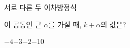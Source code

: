 서로 다른 두 이차방정식 \par\smallskip{}\par\smallskip\noindent 이 공통인 근 $\alpha$를 가질 때, $k+\alpha$의 값은? 
\begin{choices32}{$-4$}{$-3$}{$-2$}{$-1$}{$0$}\end{choices32}
